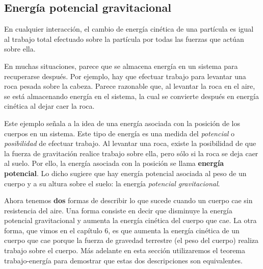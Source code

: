 \documentclass{article}
\newcommand{\newsubsection}[1]{
    \vspace{0.5cm}
    \color{sectionColor}
    \subsection{ #1}
    \color{black}
    \vspace{0.5cm}
}
\newcommand{\bl}[1]{\textbf{#1}}
\begin{document}
    \newsubsection{Energía potencial gravitacional}

    \par En cualquier interacción, el cambio de energía cinética de una partícula es igual al trabajo total efectuado sobre la partícula por todas las fuerzas que actúan sobre ella.

    \par En muchas situaciones, parece que se almacena energía en un sistema para recuperarse después. Por ejemplo, hay que efectuar trabajo para levantar una roca pesada sobre la cabeza. Parece razonable que, al levantar la roca en el aire, se está almacenando energía en el sistema, la cual se convierte después en energía cinética al dejar caer la roca.

    \vspace{0.5cm}

    \par Este ejemplo señala a la idea de una energía asociada con la posición de los cuerpos en un sistema. Este tipo de energía es una medida del \textit{potencial} o \textit{posibilidad} de efectuar trabajo. Al levantar una roca, existe la posibilidad de que la fuerza de gravitación realice trabajo sobre ella, pero sólo si la roca se deja caer al suelo. Por ello, la energía asociada con la posición se llama \bl{energía potencial}. Lo dicho sugiere que hay energía potencial asociada al peso de un cuerpo y a su altura sobre el suelo: la energía \textit{potencial gravitacional}.

    \par Ahora tenemos \bl{dos} formas de describir lo que sucede cuando un cuerpo cae sin resistencia del aire. Una forma consiste en decir que disminuye la energía potencial gravitacional y aumenta la energía cinética del cuerpo que cae. La otra forma, que vimos en el capítulo 6, es que aumenta la energía cinética de un cuerpo que cae porque la fuerza de gravedad terrestre (el peso del cuerpo) realiza trabajo sobre el cuerpo. Más adelante en esta sección utilizaremos el teorema trabajo-energía para demostrar que estas dos descripciones son equivalentes.
\end{document}
